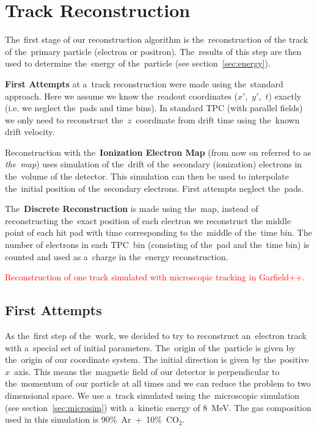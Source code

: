 \chapter{Track Reconstruction}
\label{sec:track}
	The~first stage of our reconstruction algorithm is the~reconstruction of the track of the~primary particle (electron or positron). The~results of this step are then used to determine the~energy of the~particle (see section~\ref{sec:energy}).
	
	\textbf{First Attempts} at a~track reconstruction were made using the~standard approach. Here we assume we know the~readout coordinates ($x'$,~$y'$,~$t$) exactly (i.e. we neglect the~pads and time bins). In standard \ac{TPC} (with parallel fields) we only need to reconstruct the~$z$~coordinate from drift time using the~known drift velocity.
	
	Reconstruction with the~\textbf{Ionization Electron Map} (from now on referred to as \emph{the~map}) uses simulation of the~drift of the~secondary (ionization) electrons in the~volume of the detector. This simulation can then be used to interpolate the~initial position of the~secondary electrons. First attempts neglect the~pads.
	
	The~\textbf{Discrete Reconstruction} is made using the~map, instead of reconstructing the~exact position of each electron we reconstruct the middle point of each hit pad with time corresponding to the~middle of the~time bin. The number of electrons in each \ac{TPC}~bin (consisting of the~pad and the~time bin) is counted and used as a~charge in the~energy reconstruction.
	
	\textcolor{red}{Reconstruction of one track simulated with microscopic tracking in Garfield++.}
	
	\section{First Attempts}
		As the~first step of the~work, we decided to try to reconstruct an~electron track with a~special set of initial parameters. The~origin of the~particle is given by the~origin of our coordinate system. The initial direction is given by the~positive $x$~axis. This means the~magnetic field of our detector is perpendicular to the~momentum of our particle at all times and we can reduce the problem to two dimensional space. We use a~track simulated using the~microscopic simulation (see section~\ref{sec:microsim}) with a~kinetic energy of 8~MeV. The gas composition used in this simulation is 90\%~Ar~+~10\%~CO$_2$.
		
